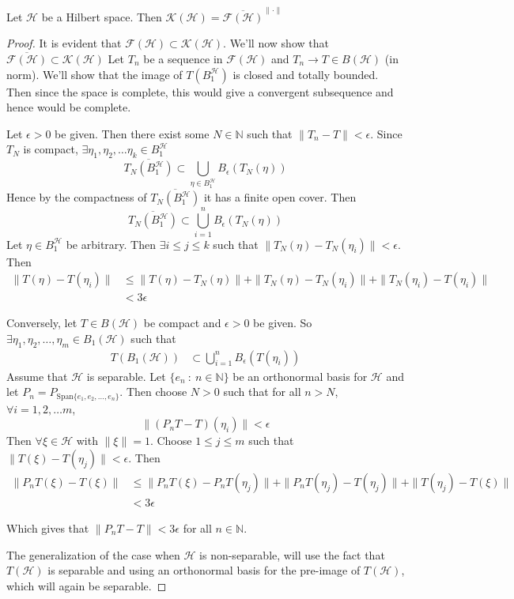 \begin{theorem}
  Let $\mathcal{H}$ be a Hilbert space. Then $\mathcal{K}(\mathcal{H}) =
  \overline{\mathcal{F}(\mathcal{H})}^{\|\cdot\|}$
\end{theorem}
\begin{proof}
  It is evident that $\mathcal{F}(\mathcal{H}) \subset
  \mathcal{K}(\mathcal{H})$. We'll
  now show that
  $\overline{\mathcal{F}(\mathcal{H})}\subset \mathcal{K}(\mathcal{H}) $
  Let $T_n$ be a sequence in $\mathcal{F}(\mathcal{H})$ and $T_n \to
  T \in B(\mathcal{H})$ (in
  norm). We'll show that the image of $T(B_1^\mathcal{H})$ is closed and
  totally bounded. Then since the space is complete, this would give
  a convergent subsequence and hence would be complete.

  Let $\epsilon > 0$ be given. Then there exist some $N \in
  \mathbb{N}$ such that $\|T_n - T\| < \epsilon$. Since $T_N$ is
  compact, $\exists \eta_1, \eta_2, \ldots \eta_k \in B^\mathcal{H}_1$ \[
    \overline{T_N(B_1^\mathcal{H})} \subset \bigcup_{\eta \in  B_1^\mathcal{H}}
    B_\epsilon(T_N(\eta))
  \]
  Hence by the compactness of $\overline{T_N(B_1^\mathcal{H})}$ it has a finite
  open cover. Then \[
    \overline{T_N(B_1^\mathcal{H})} \subset \bigcup_{i =
    1}^{n}B_\epsilon(T_N(\eta))
  \]
  Let $\eta \in B_1^\mathcal{H}$ be arbitrary. Then $\exists i \le j \le k$
  such that $\|T_N(\eta) - T_N(\eta_i)\| < \epsilon$. Then
  \begin{align*}
    \|T(\eta) - T(\eta_i)\| &\le \|T(\eta) - T_N(\eta)\| + \|T_N(\eta)
    - T_N(\eta_i)\| + \|T_N(\eta_i) - T(\eta_i)\| \\
    & < 3 \epsilon
  \end{align*}

  Conversely, let $T \in B(\mathcal{H})$ be compact and $\epsilon>0$ be given.
  So $\exists \eta_1, \eta_2, \ldots , \eta_m \in B_1(\mathcal{H})$ such that
  \begin{align*}
    T(B_1(\mathcal{H})) &\subset \bigcup_{i = 1}^{n}B_\epsilon(T(\eta_i))
  \end{align*}
  Assume that $\mathcal{H}$ is separable. Let $\{ e_n  \ : \  n \in
  \mathbb{N} \}$ be an orthonormal basis for $\mathcal{H}$ and let $P_n =
  P_{\textrm{Span}\{e_1 , e_2 , \ldots , e_n\}}$. Then choose $ N>0$
  such that for all $n >N$, $\forall i = 1, 2, \ldots m$, \[
    \|(P_nT - T)(\eta_i)\| < \epsilon
  \]
  Then $\forall \xi \in \mathcal{H}$ with $\|\xi\| = 1$. Choose $1 \le j \le
  m$ such that $\|T(\xi) - T(\eta_j)\| < \epsilon$. Then
  \begin{align*}
    \|P_nT(\xi) - T(\xi)\| & \le \|P_nT(\xi) - P_nT(\eta_j)\| +
    \|P_nT(\eta_j) - T(\eta_j)\| + \|T(\eta_j) - T(\xi)\| \\
    &< 3\epsilon
  \end{align*}

  Which gives that $\|P_nT - T\| < 3\epsilon$ for all $n \in \mathbb{N}$.

  The generalization of the case when $\mathcal{H}$ is non-separable, will use
  the fact that $T(\mathcal{H})$ is separable and using an orthonormal basis
  for the pre-image of $T(\mathcal{H})$, which will again be separable.
\end{proof}

